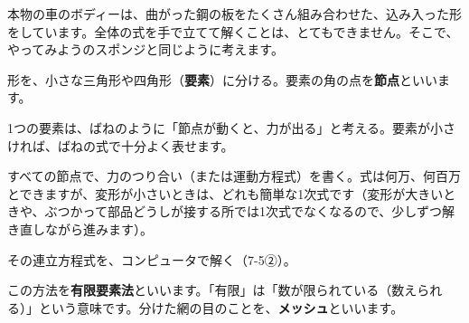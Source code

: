 本物の車のボディーは、曲がった鋼の板をたくさん組み合わせた、込み入った形をしています。全体の式を手で立てて解くことは、とてもできません。そこで、やってみようのスポンジと同じように考えます。
\begin{enumerate}[label={\bkcircled[bkBlue]{\arabic*}}, leftmargin=2.4\zw, itemsep=1pt, topsep=2pt]
\item 形を、小さな三角形や四角形（\textbf{要素}）に分ける。要素の角の点を\textbf{節点}といいます。
\item 1つの要素は、ばねのように「節点が動くと、力が出る」と考える。要素が小さければ、ばねの式で十分よく表せます。
\item すべての節点で、力のつり合い（または運動方程式）を書く。式は何万、何百万とできますが、変形が小さいときは、どれも簡単な1次式です（変形が大きいときや、ぶつかって部品どうしが接する所では1次式でなくなるので、少しずつ解き直しながら進みます）。
\item その連立方程式を、コンピュータで解く（\mbox{7-5②}）。
\end{enumerate}
この方法を\textbf{有限要素法}といいます。「有限」は「数が限られている（数えられる）」という意味です。分けた網の目のことを、\textbf{メッシュ}といいます。
